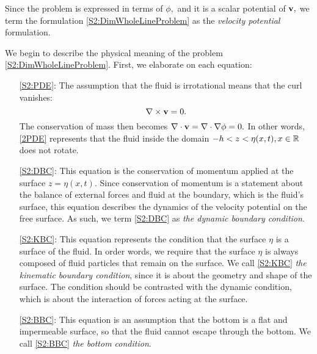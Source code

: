 \documentclass[11pt,reqno,oneside,a4paper]{article}
\begin{document}
Since the problem is expressed in terms of $\phi,$ and it is a scalar potential of ${\bf v},$ we term the formulation \eqref{S2:DimWholeLineProblem} as the \textit{velocity potential} formulation.

We begin to describe the physical meaning of the problem \eqref{S2:DimWholeLineProblem}. First, we elaborate on each equation:
\begin{itemize}
\item[\eqref{S2:PDE}:] The assumption that the fluid is irrotational means that the curl vanishes:
\[ \nabla \times {\bf v} = 0. \]
The conservation of mass then becomes $ \nabla \cdot {\bf v} = \nabla \cdot \nabla \phi = 0.$ In other words, \eqref{2PDE} represents that the fluid inside the domain $-h < z < \eta(x,t), x \in \mathbb R$ does not rotate.  
\item[\eqref{S2:DBC}:] This equation is the conservation of momentum applied at the surface $z = \eta(x,t).$ Since conservation of momentum is a statement about the balance of external forces and fluid at the boundary, which is the fluid's surface, this equation describes the dynamics of the velocity potential on the free surface. As such, we term \eqref{S2:DBC} as \textit{the dynamic boundary condition}.
\item[\eqref{S2:KBC}:] This equation represents the condition that the surface $\eta$ is a surface of the fluid. In order words, we require that the surface $\eta$ is always composed of 
fluid particles that remain on the surface. We call \eqref{S2:KBC} \textit{the kinematic boundary condition}, since it is about the geometry and shape of the surface. The condition should be contrasted with the dynamic condition, which is about the interaction of forces acting at the surface. 
\item[\eqref{S2:BBC}:] This equation is an assumption that the bottom is a flat and impermeable surface, so that the fluid cannot escape through the bottom. We call \eqref{S2:BBC} \textit{the bottom condition}. 
\end{itemize}
\end{document}
